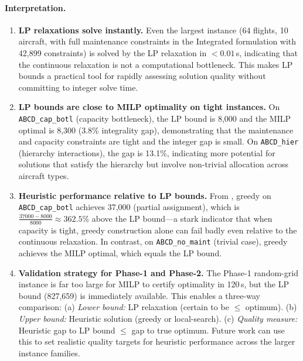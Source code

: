 \paragraph{Interpretation.}
\begin{enumerate}
  \item \textbf{LP relaxations solve instantly.}
    Even the largest instance (64 flights, 10 aircraft, with full maintenance
    constraints in the Integrated formulation with 42,899 constraints) is solved
    by the LP relaxation in $<0.01$\,s, indicating that the continuous relaxation
    is not a computational bottleneck. This makes LP bounds a practical tool for
    rapidly assessing solution quality without committing to integer solve time.

  \item \textbf{LP bounds are close to MILP optimality on tight instances.}
    On \texttt{ABCD\_cap\_botl} (capacity bottleneck), the LP bound is 8,000
    and the MILP optimal is 8,300 (3.8\% integrality gap), demonstrating that the
    maintenance and capacity constraints are tight and the integer gap is small.
    On \texttt{ABCD\_hier} (hierarchy interactions), the gap is 13.1\%, indicating
    more potential for solutions that satisfy the hierarchy but involve
    non-trivial allocation across aircraft types.

  \item \textbf{Heuristic performance relative to LP bounds.}
    From , greedy on \texttt{ABCD\_cap\_botl}
    achieves 37,000 (partial assignment), which is
    $\frac{37000 - 8000}{8000} \approx 362.5\%$ above the LP bound---a stark
    indicator that when capacity is tight, greedy construction alone can fail
    badly even relative to the continuous relaxation. In contrast, on
    \texttt{ABCD\_no\_maint} (trivial case), greedy achieves the MILP optimal,
    which equals the LP bound.

  \item \textbf{Validation strategy for Phase-1 and Phase-2.}
    The Phase-1 random-grid instance is far too large for MILP to certify
    optimality in 120\,s, but the LP bound (827,659) is immediately available.
    This enables a three-way comparison:
    (a) \emph{Lower bound:} LP relaxation (certain to be $\le$ optimum).
    (b) \emph{Upper bound:} Heuristic solution (greedy or local-search).
    (c) \emph{Quality measure:} Heuristic gap to LP bound $\le$ gap to true optimum.
    Future work can use this to set realistic quality targets for heuristic
    performance across the larger instance families.
\end{enumerate}

